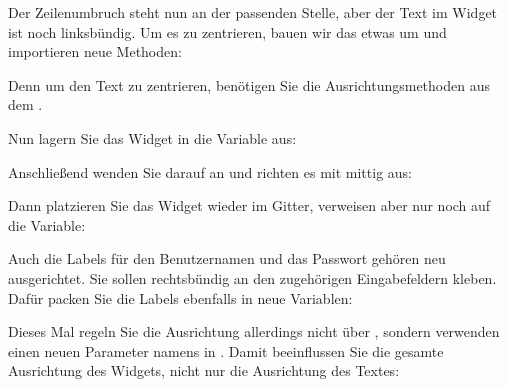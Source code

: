     

Der Zeilenumbruch steht nun an der passenden Stelle, aber der Text im Widget ist noch linksbündig. Um es zu zentrieren, bauen wir das  etwas um und importieren neue Methoden:
    
\medskip
    

\medskip

Denn um den Text zu zentrieren, benötigen Sie die Ausrichtungsmethoden aus dem .
    
Nun lagern Sie das Widget in die Variable  aus:
    
\medskip


\medskip

Anschließend wenden Sie  darauf an und richten es mit  mittig aus:
 
\medskip


\medskip

Dann platzieren Sie das Widget wieder im Gitter, verweisen aber nur noch auf die Variable:

\medskip


\medskip

Auch die Labels für den Benutzernamen und das Passwort gehören neu ausgerichtet. Sie sollen rechtsbündig an den zugehörigen Eingabefeldern kleben. Dafür packen Sie die Labels ebenfalls in neue Variablen:
    
\medskip



\medskip

Dieses Mal regeln Sie die Ausrichtung allerdings nicht über , sondern verwenden einen neuen Parameter namens  in . Damit beeinflussen Sie die gesamte Ausrichtung des Widgets, nicht nur die Ausrichtung des Textes:
    
\medskip


